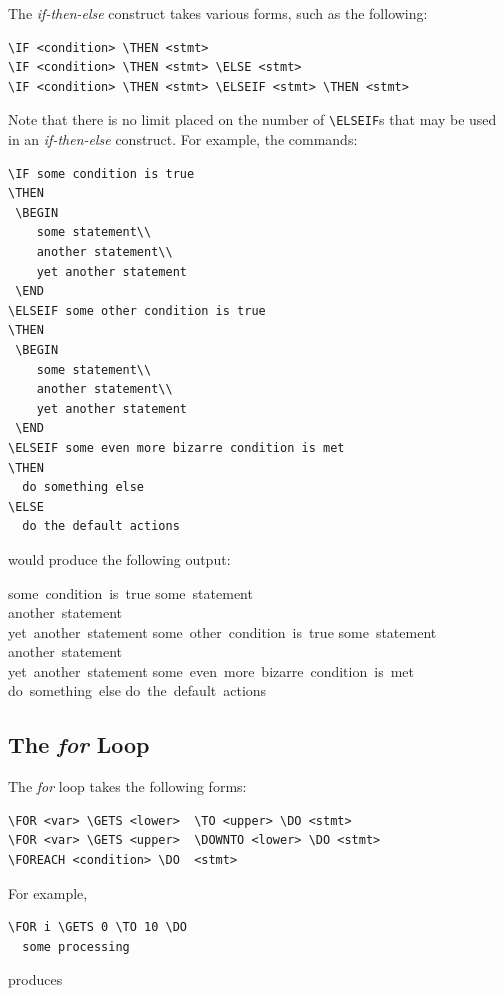 \documentclass[a4]{article}
\begin{document}
The {\em if-then-else} construct takes various forms,
such as the following:
\begin{verbatim}
\IF <condition> \THEN <stmt> 
\IF <condition> \THEN <stmt> \ELSE <stmt> 
\IF <condition> \THEN <stmt> \ELSEIF <stmt> \THEN <stmt> 
\end{verbatim}
Note that there is no limit placed on the number
of \verb+\ELSEIF+s that may be used in an {\em if-then-else} construct.
For example,  the commands:
\begin{verbatim}
\IF some condition is true
\THEN
 \BEGIN
    some statement\\
    another statement\\
    yet another statement
 \END
\ELSEIF some other condition is true
\THEN
 \BEGIN
    some statement\\
    another statement\\
    yet another statement
 \END
\ELSEIF some even more bizarre condition is met
\THEN 
  do something else
\ELSE
  do the default actions
\end{verbatim}

\noindent{}would produce the following output:

\medskip
\begin{pseudocode}[display]{}{}
\IF \mbox{some condition is true}
\THEN 
\BEGIN
\mbox{some statement}\\
\mbox{another statement}\\
\mbox{yet another statement}
\END
\ELSEIF \mbox{some other condition is true}
\THEN 
\BEGIN
\mbox{some statement}\\
\mbox{another statement}\\
\mbox{yet another statement}
\END
\ELSEIF\mbox{some even more bizarre condition is met}
\THEN \mbox{do something else}
\ELSE
\mbox{do the default actions}
\end{pseudocode}

\subsection{The {\em for} Loop}

The {\em for} loop takes the following forms:
\begin{verbatim}
\FOR <var> \GETS <lower>  \TO <upper> \DO <stmt> 
\FOR <var> \GETS <upper>  \DOWNTO <lower> \DO <stmt> 
\FOREACH <condition> \DO  <stmt> 
\end{verbatim}
For example,
\begin{verbatim}
\FOR i \GETS 0 \TO 10 \DO
  some processing
\end{verbatim}
produces
\end{document}
